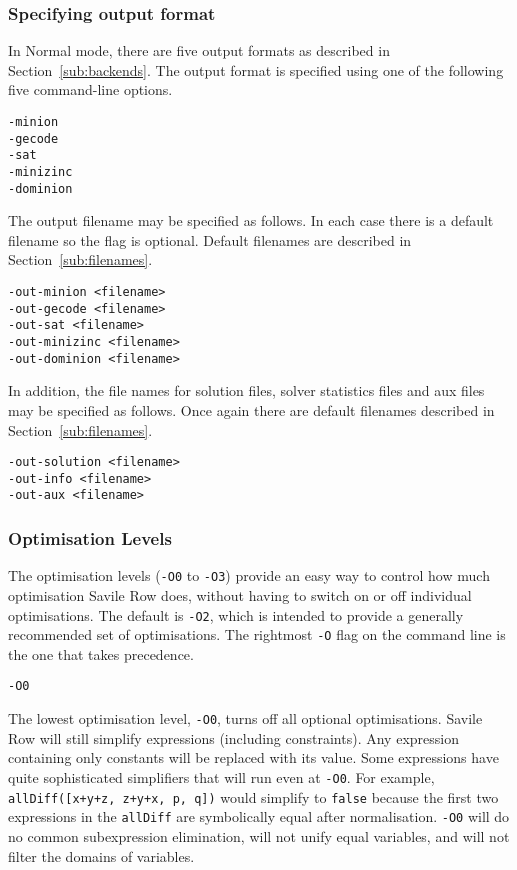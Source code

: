 \documentclass[a4paper]{article}
\newcommand{\savilerow}{{\sc Savile Row}\xspace}
\begin{document}
\subsubsection{Specifying output format}

In Normal mode, there are five output formats as described in Section~\ref{sub:backends}. The
output format is specified using one of the following five command-line options. 

\begin{verbatim}
-minion
-gecode
-sat
-minizinc
-dominion
\end{verbatim}

The output filename may be specified as follows. In each case there is a default
filename so the flag is optional. Default filenames are described in Section~\ref{sub:filenames}.

\begin{verbatim}
-out-minion <filename>
-out-gecode <filename>
-out-sat <filename>
-out-minizinc <filename>
-out-dominion <filename>
\end{verbatim}

In addition, the file names for solution files, solver statistics files and 
aux files may be 
specified as follows. Once again there are default filenames described in Section~\ref{sub:filenames}.

\begin{verbatim}
-out-solution <filename>
-out-info <filename>
-out-aux <filename>
\end{verbatim}

\subsubsection{Optimisation Levels}

The optimisation levels (\verb|-O0| to \verb|-O3|) provide an easy way to control
how much optimisation \savilerow does, without having to switch on or off individual
optimisations. The default is \verb|-O2|, which is intended to provide a generally
recommended set of optimisations. The rightmost \texttt{-O} flag on the command line
is the one that takes precedence. 

\begin{verbatim}
-O0
\end{verbatim}

The lowest optimisation level, \texttt{-O0}, turns off all optional optimisations.
\savilerow will still simplify expressions (including constraints). Any expression containing
only constants will be replaced with its value. Some expressions have quite sophisticated 
simplifiers that will run even at \texttt{-O0}. For example, \texttt{allDiff([x+y+z, z+y+x, p, q])}
would simplify to \texttt{false} because the first two expressions in the \texttt{allDiff} are
symbolically equal after normalisation. \texttt{-O0} will do no common subexpression 
elimination, will not unify equal variables, and will not filter the domains of
variables. 
\end{document}
